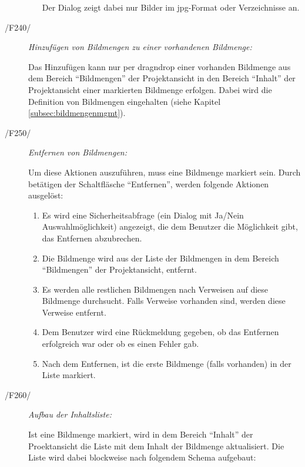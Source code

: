 \begin{description}
\begin{itemize}
\begin{itemize}
					\end{itemize}
				
				Der Dialog zeigt dabei nur Bilder im \gls{jpg}-Format oder Verzeichnisse an.
				
			\end{itemize}
		
		\item[/F240/] \textit{Hinzufügen von Bildmengen zu einer vorhandenen Bildmenge:}\par Das Hinzufügen kann nur per \gls{dragndrop} einer vorhanden Bildmenge aus dem Bereich "`Bildmengen"' der Projektansicht in den Bereich "`Inhalt"' der Projektansicht einer markierten Bildmenge erfolgen. Dabei wird die Definition von Bildmengen eingehalten (siehe Kapitel \ref{subsec:bildmengenmgmt}).
		
		\item[/F250/] \textit{Entfernen von Bildmengen:}\par Um diese Aktionen auszuführen, muss eine Bildmenge markiert sein. Durch betätigen der Schaltfläsche "`Entfernen"', werden folgende Aktionen ausgelöst:
			
			\begin{enumerate}
			
				\item Es wird eine Sicherheitsabfrage (ein Dialog mit Ja/Nein Auswahlmöglichkeit) angezeigt, die dem Benutzer die Möglichkeit gibt, das Entfernen abzubrechen.
				
				\item Die Bildmenge wird aus der Liste der Bildmengen in dem Bereich "`Bildmengen"' der Projektansicht, entfernt.
				
				\item Es werden alle restlichen Bildmengen nach Verweisen auf diese Bildmenge durchsucht. Falls Verweise vorhanden sind, werden diese Verweise entfernt.
				
				\item Dem Benutzer wird eine Rückmeldung gegeben, ob das Entfernen erfolgreich war oder ob es einen Fehler gab.
				
				\item Nach dem Entfernen, ist die erste Bildmenge (falls vorhanden) in der Liste markiert.
			
			\end{enumerate}

		\item[/F260/] \textit{Aufbau der Inhaltsliste:}\par Ist eine Bildmenge markiert, wird in dem Bereich "`Inhalt"' der Proektansicht die Liste mit dem Inhalt der Bildmenge aktualisiert. Die Liste wird dabei blockweise nach folgendem Schema aufgebaut:
		

\end{description}
